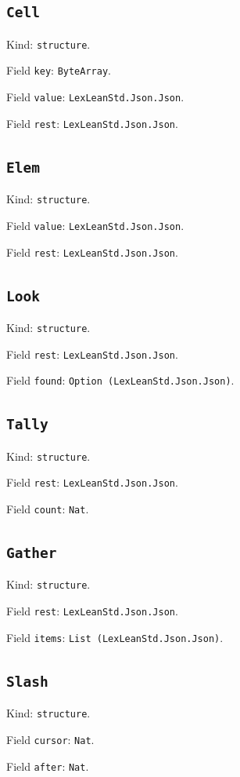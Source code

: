 \documentclass[11pt]{article}
\begin{document}
\subsection*{\texttt{Cell}}
\noindent Kind: \texttt{structure}.\par
\noindent Field \texttt{key}: \texttt{ByteArray}.\par
\noindent Field \texttt{value}: \texttt{LexLeanStd.Json.Json}.\par
\noindent Field \texttt{rest}: \texttt{LexLeanStd.Json.Json}.\par
\subsection*{\texttt{Elem}}
\noindent Kind: \texttt{structure}.\par
\noindent Field \texttt{value}: \texttt{LexLeanStd.Json.Json}.\par
\noindent Field \texttt{rest}: \texttt{LexLeanStd.Json.Json}.\par
\subsection*{\texttt{Look}}
\noindent Kind: \texttt{structure}.\par
\noindent Field \texttt{rest}: \texttt{LexLeanStd.Json.Json}.\par
\noindent Field \texttt{found}: \texttt{Option (LexLeanStd.Json.Json)}.\par
\subsection*{\texttt{Tally}}
\noindent Kind: \texttt{structure}.\par
\noindent Field \texttt{rest}: \texttt{LexLeanStd.Json.Json}.\par
\noindent Field \texttt{count}: \texttt{Nat}.\par
\subsection*{\texttt{Gather}}
\noindent Kind: \texttt{structure}.\par
\noindent Field \texttt{rest}: \texttt{LexLeanStd.Json.Json}.\par
\noindent Field \texttt{items}: \texttt{List (LexLeanStd.Json.Json)}.\par
\subsection*{\texttt{Slash}}
\noindent Kind: \texttt{structure}.\par
\noindent Field \texttt{cursor}: \texttt{Nat}.\par
\noindent Field \texttt{after}: \texttt{Nat}.\par
\end{document}
